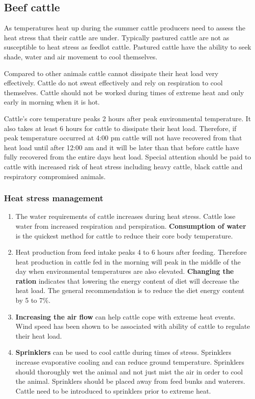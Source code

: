\documentclass[]{book}
\begin{document}
\hypertarget{beef-cattle}{%
\subsection{Beef cattle}\label{beef-cattle}}

As temperatures heat up during the summer cattle producers need to assess the heat stress that their cattle are under. Typically pastured cattle are not as susceptible to heat stress as feedlot cattle. Pastured cattle have the ability to seek shade, water and air movement to cool themselves.

Compared to other animals cattle cannot dissipate their heat load very effectively. Cattle do not sweat effectively and rely on respiration to cool themselves. Cattle should not be worked during times of extreme heat and only early in morning when it is hot.

Cattle's core temperature peaks 2 hours after peak environmental temperature. It also takes at least 6 hours for cattle to dissipate their heat load. Therefore, if peak temperature occurred at 4:00 pm cattle will not have recovered from that heat load until after 12:00 am and it will be later than that before cattle have fully recovered from the entire days heat load. Special attention should be paid to cattle with increased risk of heat stress including heavy cattle, black cattle and respiratory compromised animals.

\hypertarget{heat-stress-management}{%
\subsubsection{Heat stress management}\label{heat-stress-management}}

\begin{enumerate}
\def\labelenumi{\arabic{enumi}.}
\item
  The water requirements of cattle increases during heat stress. Cattle lose water from increased respiration and perspiration. \textbf{Consumption of water} is the quickest method for cattle to reduce their core body temperature.
\item
  Heat production from feed intake peaks 4 to 6 hours after feeding. Therefore heat production in cattle fed in the morning will peak in the middle of the day when environmental temperatures are also elevated. \textbf{Changing the ration} indicates that lowering the energy content of diet will decrease the heat load. The general recommendation is to reduce the diet energy content by 5 to 7\%.
\item
  \textbf{Increasing the air flow} can help cattle cope with extreme heat events. Wind speed has been shown to be associated with ability of cattle to regulate their heat load.
\item
  \textbf{Sprinklers} can be used to cool cattle during times of stress. Sprinklers increase evaporative cooling and can reduce ground temperature. Sprinklers should thoroughly wet the animal and not just mist the air in order to cool the animal. Sprinklers should be placed away from feed bunks and waterers. Cattle need to be introduced to sprinklers prior to extreme heat.
\end{enumerate}
\end{document}
